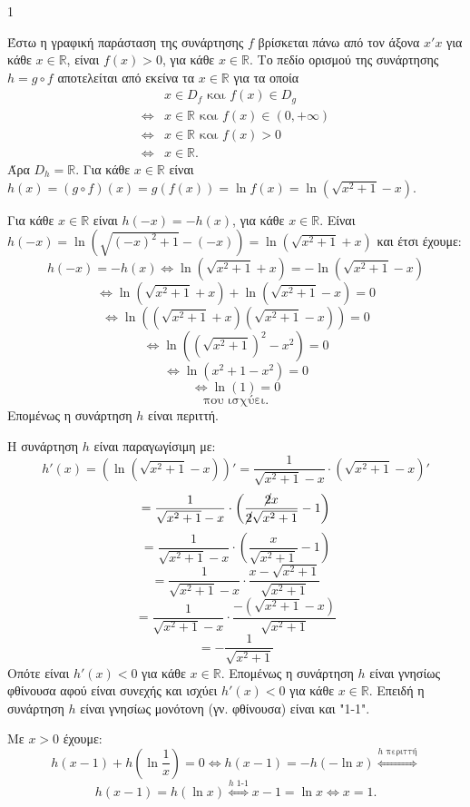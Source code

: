 \begin{ylh}{1}
    \item [Ύλη από εικόνα]
\end{ylh}
Έστω η γραφική παράσταση της συνάρτησης $f$ βρίσκεται πάνω από τον άξονα $x'x$ για κάθε $x \in \mathbb{R}$, είναι $f(x)>0$, για κάθε $x \in \mathbb{R}$.
Το πεδίο ορισμού της συνάρτησης $h = g \circ f$ αποτελείται από εκείνα τα $x \in \mathbb{R}$ για τα οποία
\[
\begin{aligned}
& x \in D_f \text{ και } f(x) \in D_g \\
\Leftrightarrow{} & x \in \mathbb{R} \text{ και } f(x) \in (0, +\infty) \\
\Leftrightarrow{} & x \in \mathbb{R} \text{ και } f(x) > 0 \\
\Leftrightarrow{} & x \in \mathbb{R}.
\end{aligned}
\]
Άρα $D_h = \mathbb{R}.$
Για κάθε $x \in \mathbb{R}$ είναι $h(x) = (g \circ f)(x) = g(f(x)) = \ln f(x) = \ln(\sqrt{x^2+1}-x).$

\begin{alist}
    \item [$\beta$)]
    \begin{rlist}
        \item [] Για κάθε $x \in \mathbb{R}$ είναι $h(-x) = -h(x)$, για κάθε $x \in \mathbb{R}$.
        Είναι $h(-x) = \ln(\sqrt{(-x)^2+1}-(-x)) = \ln(\sqrt{x^2+1}+x)$ και έτσι έχουμε:
        \[ h(-x) = -h(x) \Leftrightarrow \ln(\sqrt{x^2+1}+x) = -\ln(\sqrt{x^2+1}-x) \]
        \[ \Leftrightarrow \ln(\sqrt{x^2+1}+x) + \ln(\sqrt{x^2+1}-x) = 0 \]
        \[ \Leftrightarrow \ln\left((\sqrt{x^2+1}+x)(\sqrt{x^2+1}-x)\right) = 0 \]
        \[ \Leftrightarrow \ln\left((\sqrt{x^2+1})^2-x^2\right) = 0 \]
        \[ \Leftrightarrow \ln(x^2+1-x^2) = 0 \]
        \[ \Leftrightarrow \ln(1) = 0 \]
        \[ \text{που ισχύει.} \]
        Επομένως η συνάρτηση $h$ είναι περιττή.
        \item [] Η συνάρτηση $h$ είναι παραγωγίσιμη με:
        \[ h'(x) = \left(\ln\left(\sqrt{x^2+1}-x\right)\right)' = \frac{1}{\sqrt{x^2+1}-x} \cdot \left(\sqrt{x^2+1}-x\right)' \]
        \[ = \frac{1}{\sqrt{x^2+1}-x} \cdot \left(\frac{\cancel{2}x}{\cancel{2}\sqrt{x^2+1}}-1\right) \]
        \[ = \frac{1}{\sqrt{x^2+1}-x} \cdot \left(\frac{x}{\sqrt{x^2+1}}-1\right) \]
        \[ = \frac{1}{\sqrt{x^2+1}-x} \cdot \frac{x-\sqrt{x^2+1}}{\sqrt{x^2+1}} \]
        \[ = \frac{1}{\sqrt{x^2+1}-x} \cdot \frac{-\left( \sqrt{x^2+1} - x \right)}{\sqrt{x^2+1}} \]
        \[ = -\frac{1}{\sqrt{x^2+1}} \]
        Οπότε είναι $h'(x) < 0$ για κάθε $x \in \mathbb{R}$.
        Επομένως η συνάρτηση $h$ είναι γνησίως φθίνουσα αφού είναι συνεχής και ισχύει $h'(x) < 0$ για κάθε $x \in \mathbb{R}$. Επειδή η συνάρτηση $h$ είναι γνησίως μονότονη (γν. φθίνουσα) είναι και "1-1".
    \end{rlist}
    \item [$\gamma$)] Με $x>0$ έχουμε:
    \[ h(x-1)+h\left(\ln\frac{1}{x}\right)=0 \Leftrightarrow h(x-1)=-h(-\ln x) \stackrel{h\text{ περιττή}}{\Leftrightarrow} \]
    \[ h(x-1)=h(\ln x) \stackrel{h\text{ 1-1}}{\Leftrightarrow} x-1=\ln x \Leftrightarrow x=1. \]
\end{alist}